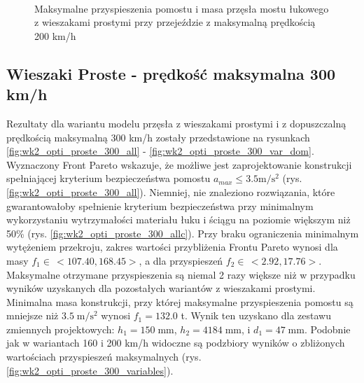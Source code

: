 \begin{figure}[hbt!]
	\centering
	\\
	\captionsetup{justification=centering}
	\caption{Maksymalne przyspieszenia pomostu i masa przęsła mostu łukowego z wieszakami prostymi przy przejeździe z maksymalną prędkością 200 km/h}
	\label{fig:wk2_opti_proste_200_var_dom}
\end{figure}







\pagebreak[4]
\subsection{Wieszaki Proste - prędkość maksymalna 300 km/h}

Rezultaty dla wariantu modelu przęsła z wieszakami prostymi i z dopuszczalną prędkością maksymalną 300 km/h zostały przedstawione na rysunkach \ref{fig:wk2_opti_proste_300_all} - \ref{fig:wk2_opti_proste_300_var_dom}. Wyznaczony Front Pareto wskazuje, że możliwe jest zaprojektowanie konstrukcji spełniającej kryterium bezpieczeństwa pomostu $a_{max}\le 3.5 \mathrm{m/s^2}$ (rys. \ref{fig:wk2_opti_proste_300_all}). Niemniej, nie znaleziono rozwiązania, które gwarantowałoby spełnienie kryterium bezpieczeństwa przy minimalnym wykorzystaniu wytrzymałości materiału łuku i ściągu na poziomie większym niż 50\% (rys. \ref{fig:wk2_opti_proste_300_allc}). Przy braku ograniczenia minimalnym wytężeniem przekroju, zakres wartości przybliżenia Frontu Pareto wynosi dla masy $f_1 \in\,<107.40,168.45>$, a dla przyspieszeń $f_2 \in\,<2.92,17.76>$. Maksymalne otrzymane przyspieszenia są niemal 2 razy większe niż w przypadku wyników uzyskanych dla pozostałych wariantów z wieszakami prostymi. Minimalna masa konstrukcji, przy której maksymalne przyspieszenia pomostu są mniejsze niż $3.5\;\mathrm{m/s^2}$ wynosi $f_1 = 132.0$ t. Wynik ten uzyskano dla zestawu zmiennych projektowych: $h_1 = 150\;\mathrm{mm}$, $h_2 = 4184\;\mathrm{mm}$, i $d_1 = 47\;\mathrm{mm}$. Podobnie jak w wariantach 160 i 200 km/h widoczne są podzbiory wyników o zbliżonych wartościach przyspieszeń maksymalnych (rys. \ref{fig:wk2_opti_proste_300_variables}). 


